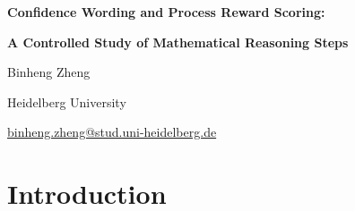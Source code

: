 \documentclass[11pt,a4paper]{article}
\let\ArticleSubsection\subsection
\let\ArticleSubsubsection\subsubsection
\let\ArticleParagraph\paragraph
\newcommand{\inputchapter}[1]{%
  \begingroup
    \let\section\ArticleSubsection
    \let\subsection\ArticleSubsubsection
    \let\subsubsection\ArticleParagraph
    \par
  \endgroup
}
\begin{document}
\rmfamily
{}
\thispagestyle{firstpage}

\begin{center}
  \vspace*{2mm}

  {\LARGE\bfseries
    Confidence Wording and Process Reward Scoring:\par
  }
  \vspace{3mm}
  {\Large\bfseries
    A Controlled Study of Mathematical Reasoning Steps\par
  }

  \vspace{7mm}

  {\large
    Binheng Zheng
    \par
  }

  \vspace{3mm}

  {\small
    Heidelberg University 
    \par
  }

  \vspace{3mm}

  {\footnotesize
    \href{mailto:binheng.zheng@stud.uni-heidelberg.de}
      {binheng.zheng@stud.uni-heidelberg.de}
    \par
  }
 
\end{center}

\vspace{3mm}

\begin{abstract}
  \small
  \setlength{\parindent}{0pt}
  \setlength{\parskip}{4pt}
  
\end{abstract}

\vspace{2mm}

\section{Introduction}
\label{c.introduction}
\inputchapter{chapter/introduction.tex}
\end{document}
